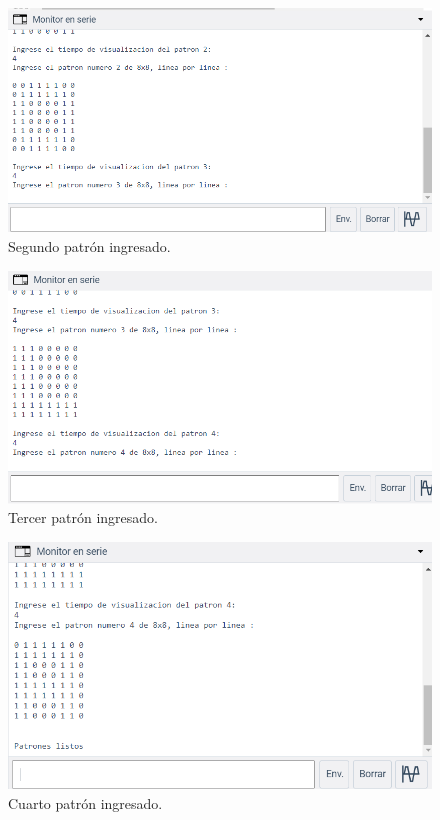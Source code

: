 \documentclass{article}
\begin{document}
\begin{enumerate}
\begin{figure}[h]
\includegraphics[scale=0.8]{patron2.png}
\centering
\caption{Segundo patrón ingresado.}
\label{fig:patron2}
\end{figure}

\newpage
\begin{figure}[h]
\includegraphics[scale=0.8]{patron3.png}
\centering
\caption{Tercer patrón ingresado.}
\label{fig:patron3}
\end{figure}


\begin{figure}[h]
\includegraphics[scale=0.8]{patron4.png}
\centering
\caption{Cuarto patrón ingresado.}
\label{fig:patron4}
\end{figure}


\end{enumerate}
\end{document}
